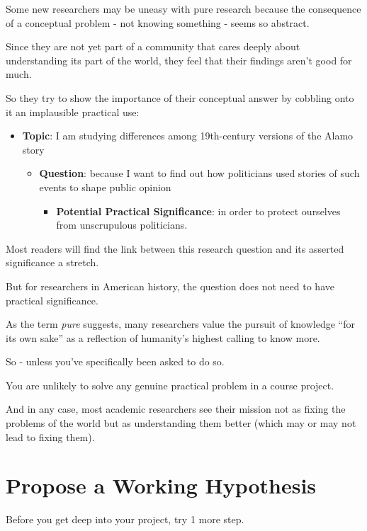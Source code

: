 \documentclass[oneside]{book}
\numberwithin{equation}{section}
\begin{document}
%
Some new researchers may be uneasy with pure research because the consequence of a conceptual problem - not knowing something - seems so abstract.

Since they are not yet part of a community that cares deeply about understanding its part of the world, they feel that their findings aren't good for much.

So they try to show the importance of their conceptual answer by cobbling onto it an implausible practical use:
\begin{itemize}
    \item[1.] \textbf{Topic}: I am studying differences among 19th-century versions of the Alamo story
    \begin{itemize}
        \item[2.] \textbf{Question}: because I want to find out how politicians used stories of such events to shape public opinion
        \begin{itemize}
            \item[3.] \textbf{Potential Practical Significance}: in order to protect ourselves from unscrupulous politicians.
        \end{itemize}
    \end{itemize}
\end{itemize}
Most readers will find the link between this research question and its asserted significance a stretch.

But for researchers in American history, the question does not need to have practical significance.

As the term \textit{pure} suggests, many researchers value the pursuit of knowledge ``for its own sake'' as a reflection of humanity's highest calling to know more.

%
So  - unless you've specifically been asked to do so.

You are unlikely to solve any genuine practical problem in a course project.

And in any case, most academic researchers see their mission not as fixing the problems of the world but as understanding them better (which may or may not lead to fixing them).

\section{Propose a Working Hypothesis}
Before you get deep into your project, try 1 more step.
\end{document}
